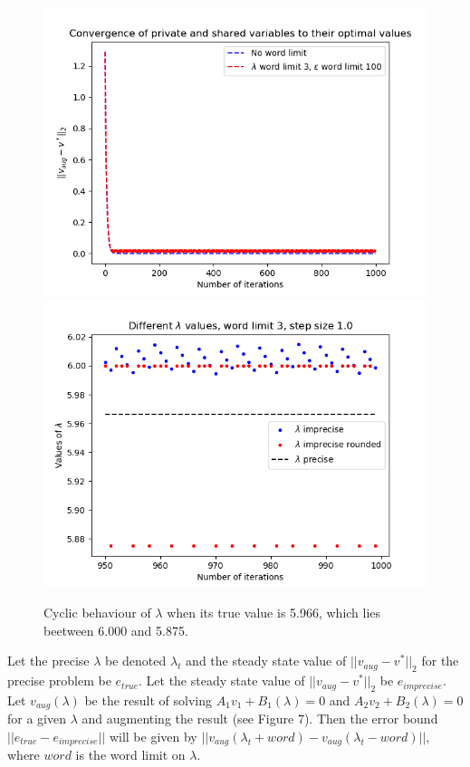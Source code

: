 \documentclass[12pt]{article}
\begin{document}
\begin{figure}[H]
	\includegraphics[scale=0.5]{Problem4-lambda3.png}
	\includegraphics[scale=0.5]{Problem4-lambda4.png}
	\caption{Cyclic behaviour of $\lambda$ when its true value is 5.966, which lies beetween 6.000 and 5.875.}
\end{figure}

Let the precise $\lambda$ be denoted $\lambda_t$ and the steady state value of $||v_{aug}-v^*||_2$ for the precise problem be $e_{true}$. Let the steady state value of $||v_{aug}-v^*||_2$ be $e_{imprecise}$. Let $v_{aug}(\lambda)$ be the result of solving $A_1v_1+B_1(\lambda)=0$ and $A_2v_2+B_2(\lambda)=0$ for a given $\lambda$ and augmenting the result (see Figure 7). Then the error bound $||e_{true}-e_{imprecise}||$ will be given by $||v_{aug}(\lambda_t+word)-v_{aug}(\lambda_t-word)||$, where $word$ is the word limit on $\lambda$.
\end{document}
